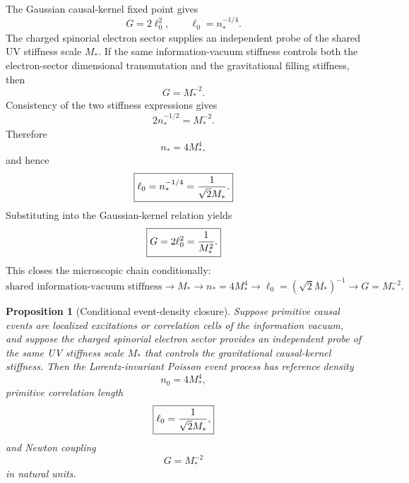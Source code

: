 \documentclass[11pt]{article}
\newtheorem{proposition}[definition]{Proposition}
\begin{document}
The Gaussian causal-kernel fixed point gives
\begin{equation}
G=2\ell_0^2,
\qquad
\ell_0=n_*^{-1/4}.
\end{equation}
The charged spinorial electron sector supplies an independent probe of the shared UV stiffness scale $M_*$. If the same information-vacuum stiffness controls both the electron-sector dimensional transmutation and the gravitational filling stiffness, then
\begin{equation}
G=M_*^{-2}.
\end{equation}
Consistency of the two stiffness expressions gives
\begin{equation}
2n_*^{-1/2}=M_*^{-2}.
\end{equation}
Therefore
\begin{equation}
\boxed{n_*=4M_*^4,}
\end{equation}
and hence
\begin{equation}
\boxed{\ell_0=n_*^{-1/4}={1\over \sqrt2 M_*}.}
\end{equation}
Substituting into the Gaussian-kernel relation yields
\begin{equation}
\boxed{G=2\ell_0^2={1\over M_*^2}.}
\end{equation}
This closes the microscopic chain conditionally:
\begin{equation}
\boxed{
\text{shared information-vacuum stiffness}
\longrightarrow M_*
\longrightarrow n_*=4M_*^4
\longrightarrow \ell_0=(\sqrt2M_*)^{-1}
\longrightarrow G=M_*^{-2}.
}
\end{equation}

\begin{proposition}[Conditional event-density closure]
\label{prop:sharedstiff}
Suppose primitive causal events are localized excitations or correlation cells of the information vacuum, and suppose the charged spinorial electron sector provides an independent probe of the same UV stiffness scale $M_*$ that controls the gravitational causal-kernel stiffness. Then the Lorentz-invariant Poisson event process has reference density
\begin{equation}
\boxed{n_0=4M_*^4,}
\end{equation}
primitive correlation length
\begin{equation}
\boxed{\ell_0={1\over\sqrt2M_*},}
\end{equation}
and Newton coupling
\begin{equation}
\boxed{G=M_*^{-2}}
\end{equation}
in natural units.
\end{proposition}
\end{document}
